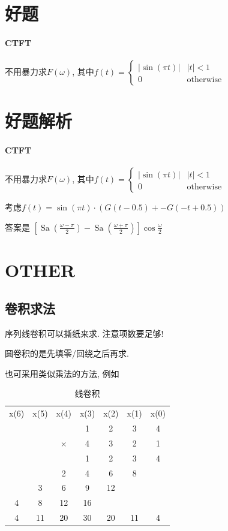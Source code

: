 \documentclass{ctexart}
\DeclareMathOperator{\Sa}{\mathrm{Sa}}
\newlength{\Oldarrayrulewidth}
\newcommand{\Hline}[1]{
  \noalign{\global\setlength{\Oldarrayrulewidth}{\arrayrulewidth}}
  \noalign{\global\setlength{\arrayrulewidth}{#1}}\hline
  \noalign{\global\setlength{\arrayrulewidth}{\Oldarrayrulewidth}}}
\newcommand{\Midline}{\Hline{0.05em}}
\begin{document}
\section{好题}
\paragraph{CTFT} 不用暴力求$F(\omega)$, 其中$f(t) = \begin{cases} |\sin(\pi t)| & |t| < 1\\ 0 & \text{otherwise} \end{cases}$


\pagebreak
\section{好题解析}
\paragraph{CTFT} 不用暴力求$F(\omega)$, 其中$f(t) = \begin{cases} |\sin(\pi t)| & |t| < 1\\ 0 & \text{otherwise} \end{cases}$\par
    考虑$f(t) = \sin(\pi t) \cdot \left( G(t-0.5) + -G(-t+0.5) \right)$\par
    答案是 $\left[\Sa\left(\frac{\omega - \pi}{2}\right) - \Sa\left(\frac{\omega + \pi}{2}\right)\right] \cos \frac{\omega}{2}$

\section{OTHER}
\subsection{卷积求法}
    序列线卷积可以撕纸来求. 注意项数要足够!\par
    圆卷积的是先填零/回绕之后再求.\par
    也可采用类似乘法的方法, 例如

    \begin{table}[ht!]
        \centering
        \begin{tabular}{*{7}{c}}
        x(6) & x(5) & x(4)     & x(3) & x(2) & x(1) & x(0) \\
        \Midline
             &      &          & 1    & 2    & 3    & 4    \\
             &      & $\times$ & 4    & 3    & 2    & 1    \\
        \Midline
             &      &          & 1    & 2    & 3    & 4    \\
             &      & 2        & 4    & 6    & 8    &      \\
             & 3    & 6        & 9    & 12   &      &      \\
        4    & 8    & 12       & 16   &      &      &      \\
        \Midline
        4    & 11   & 20       & 30   & 20   & 11   & 4    \\
        \end{tabular}
        \caption{线卷积}
    \end{table}
\end{document}
